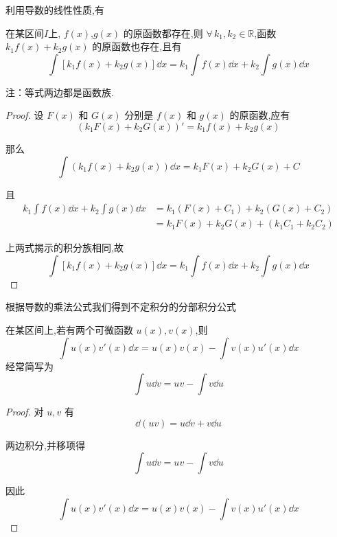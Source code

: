 利用导数的线性性质,有
\begin{proposition}
	在某区间$I$上, \( f(x) \),\( g(x) \) 的原函数都存在,则 \(\forall \, k_1, k_2 \in \mathbb{R}\),函数 \(k_1 f(x) + k_2 g(x)\) 的原函数也存在,且有
	\[
	\int [k_1 f(x) + k_2 g(x)] \dd x = k_1 \int f(x) \dd x + k_2 \int g(x) \dd x
	\]
	
\end{proposition}
注：等式两边都是函数族.
\begin{proof}
	设 \( F(x) \) 和 \( G(x) \) 分别是 \( f(x) \) 和 \( g(x) \) 的原函数,应有
	\[
	(k_1 F(x) + k_2 G(x))' = k_1 f(x) + k_2 g(x)
	\]
	
	那么
	\[
	\int (k_1 f(x) + k_2 g(x)) \dd x = k_1 F(x) + k_2 G(x) + C
	\]
	
	且
	\[\begin{aligned}
		k_1 \int f(x) \dd x + k_2 \int g(x) \dd x &= k_1 (F(x) + C_1) + k_2 (G(x) + C_2)\\	&= k_1 F(x) + k_2 G(x) + (k_1 C_1 + k_2 C_2)
	\end{aligned}\]
	
	
	上两式揭示的积分族相同,故
	\[
	\int [k_1 f(x) + k_2 g(x)] \dd x = k_1 \int f(x) \dd x + k_2 \int g(x) \dd x\]
\end{proof}
根据导数的乘法公式我们得到不定积分的分部积分公式
\begin{proposition}
	在某区间上,若有两个可微函数 $u(x), v(x)$,则
	\[
	\int u(x) v'(x) \dd x = u(x) v(x) - \int v(x) u'(x) \dd x
	\]
	经常简写为$$\int u \dd v = uv - \int v \dd u$$
	
\end{proposition}
\begin{proof}
	对 $u, v$ 有
	\[
	\dd(uv) = u \dd v + v \dd u
	\]
	
	两边积分,并移项得
	\[
	\int u \dd v = uv - \int v \dd u
	\]
	
	因此
	\[
	\int u(x) v'(x) \dd x = u(x) v(x) - \int v(x) u'(x) \dd x
	\]
\end{proof}

